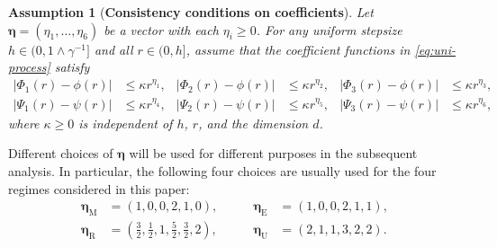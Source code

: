 \documentclass[12pt]{article}
\newenvironment{redtext}
  {\color{black}\ignorespaces}
  {\ignorespacesafterend}
\numberwithin{equation}{section}
\newtheorem{assumption}{Assumption}[section]
\begin{document}
\begin{redtext}


\begin{assumption}[\textbf{Consistency conditions on coefficients}]
\label{as:coeff-approx-general}
Let \(\boldsymbol{\eta}=(\eta_1,\dots,\eta_6)\) be a vector with each \(\eta_i\ge 0\).
For any uniform stepsize
\(h\in(0,1\wedge\gamma^{-1}]\) and all \(r\in(0,h]\), assume that the coefficient functions in \eqref{eq:uni-process} satisfy
\begin{equation}
\label{eq:general-coeff-approx}
\begin{aligned}
|\Phi_1(r)-\phi(r)|
&\leq \kappa r^{\eta_1},
&
|\Phi_2(r)-\phi(r)|
&\leq \kappa r^{\eta_2},
&
|\Phi_3(r)-\phi(r)|
&\leq \kappa r^{\eta_3},
\\
|\Psi_1(r)-\psi(r)|
&\leq \kappa r^{\eta_4},
&
|\Psi_2(r)-\psi(r)|
&\leq \kappa r^{\eta_5},
&
|\Psi_3(r)-\psi(r)|
&\leq \kappa r^{\eta_6},
\end{aligned}
\end{equation}
where \(\kappa\geq0\) is independent of \(h\), \(r\), and the dimension $d$.

\end{assumption}

Different choices of \(\boldsymbol{\eta}\) will be used for different purposes in the subsequent analysis. In particular, the following four choices are usually used for the four regimes considered in this paper:
\begin{equation}
\label{eq:eta-regimes}
\begin{aligned}
\boldsymbol{\eta}_{\mathrm{M}}
&= (1,0,0,2,1,0),
&\qquad
\boldsymbol{\eta}_{\mathrm{E}}
&= (1,0,0,2,1,1),
\\
\boldsymbol{\eta}_{\mathrm{R}}
&= \left( \tfrac32,\tfrac12,1, \tfrac52,\tfrac32,2 \right),
&\qquad
\boldsymbol{\eta}_{\mathrm{U}}
&= (2,1,1,3,2,2).
\end{aligned}
\end{equation}


\end{redtext}
\end{document}
